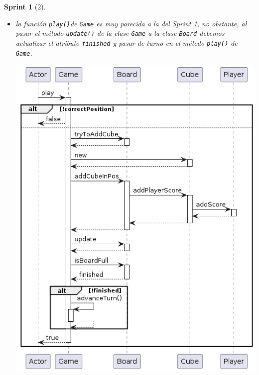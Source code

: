 \documentclass[12pt,a4paper,openright]{book}
\theoremstyle{break}
\newtheorem*{sprint}{Sprint}
\begin{document}
\begin{sprint}[2]
\begin{itemize}
\begin{center}
\end{center}
Como podemos apreciar en la imagen superior, ahora es \texttt{play()} el encargado de gestionar cuando termina el juego, así como de mostrar el ranking final del juego, que al igual que el anterior Sprint vendrá determinado por el \texttt{score} de los \texttt{Player}. Al añadir el comando \texttt{Exit} el bucle de \texttt{play()} de \texttt{Controller} podría salir del bucle y que el juego no haya terminado, por eso es necesario hacer la comprobación al saltar de turno.

\item la función \texttt{play()}de \texttt{Game} es muy parecida a la del Sprint 1, no obstante, al pasar el método \texttt{update()} de la clase \texttt{Game} a la clase \texttt{Board} debemos actualizar el atributo \texttt{finished} y pasar de turno en el método \texttt{play()} de \texttt{Game}. 
\begin{center}
\includegraphics[scale=0.5]{playgameS2.png}
\end{center}


\end{itemize}
\end{sprint}
\end{document}
